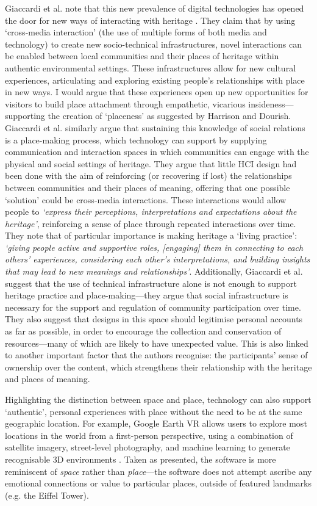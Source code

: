 Giaccardi et al. note that this new prevalence of digital technologies has opened the door for new ways of interacting with heritage \citep{Giaccardi2008}. They claim that by using `cross-media interaction' (the use of multiple forms of both media and technology) to create new socio-technical infrastructures, novel interactions can be enabled between local communities and their places of heritage within authentic environmental settings. These infrastructures allow for new cultural experiences, articulating and exploring existing people's relationships with place in new ways. I would argue that these experiences open up new opportunities for visitors to build place attachment through empathetic, vicarious insideness---supporting the creation of `placeness' as suggested by Harrison and Dourish. Giaccardi et al. similarly argue that sustaining this knowledge of social relations is a place-making process, which technology can support by supplying communication and interaction spaces in which communities can engage with the physical and social settings of heritage. They argue that little HCI design had been done with the aim of reinforcing (or recovering if lost) the relationships between communities and their places of meaning, offering that one possible `solution' could be cross-media interactions. These interactions would allow people to \textit{`express their perceptions, interpretations and expectations about the heritage'}, reinforcing a sense of place through repeated interactions over time. They note that of particular importance is making heritage a `living practice': \textit{`giving people active and supportive roles, [engaging] them in connecting to each others' experiences, considering each other's interpretations, and building insights that may lead to new meanings and relationships'}. Additionally, Giaccardi et al. suggest that the use of technical infrastructure alone is not enough to support heritage practice and place-making---they argue that social infrastructure is necessary for the support and regulation of community participation over time. They also suggest that designs in this space should legitimise personal accounts as far as possible, in order to encourage the collection and conservation of resources---many of which are likely to have unexpected value. This is also linked to another important factor that the authors recognise: the participants' sense of ownership over the content, which strengthens their relationship with the heritage and places of meaning.

Highlighting the distinction between space and place, technology can also support `authentic', personal experiences with place without the need to be at the same geographic location. For example, Google Earth VR allows users to explore most locations in the world from a first-person perspective, using a combination of satellite imagery, street-level photography, and machine learning to generate recognisable 3D environments \citep{Google}. Taken as presented, the software is more reminiscent of \textit{space} rather than \textit{place}---the software does not attempt ascribe any emotional connections or value to particular places, outside of featured landmarks (e.g. the Eiffel Tower). 

